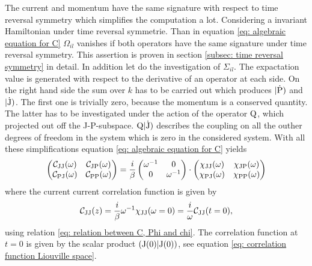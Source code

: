 The current and momentum have the same signature with respect to time reversal symmetry which simplifies the computation a lot.
Considering a invariant Hamiltonian under time reversal symmetrie.
Than in equation \eqref{eq: algebraic equation for C} $\Omega_{il}$ vanishes if both operators have the same signature under time reversal symmetry.
This assertion is proven in section \ref{subsec: time reversal symmetry} in detail.
In addition let do the investigation of $\Sigma_{il}$.
The expactation value is generated with respect to the derivative of an operator at each side. 
On the right hand side the sum over $k$ has to be carried out which produces $|\mathrm{\dot{\mathrm{P}}})$ and $|\mathrm{\dot{\mathrm{J}}})$.
The first one is trivially zero, because the momentum is a conserved quantity.
The latter has to be investigated under the action of the operator $\mathrm{Q}$, which projected out off the J-P-subspace.
$\mathrm{Q}|\mathrm{\dot{\mathrm{J}}})$ describes the coupling on all the outher degrees of freedom in the system which is zero in the considered system.
With all these simplifications equation \eqref{eq: algebraic equation for C} yields
%
\begin{align}
	\begin{pmatrix}
	\mathcal{C}_{\mathrm{JJ}}(\omega) &  \mathcal{C}_{\mathrm{JP}}(\omega) \\
	\mathcal{C}_{\mathrm{PJ}}(\omega) &  \mathcal{C}_{\mathrm{PP}}(\omega)
	\end{pmatrix}
	=
	\frac{i}{\beta}
	\begin{pmatrix}
	\omega^{-1} & 0 \\
	0 & \omega^{-1} 
	\end{pmatrix}
	\cdot
	\begin{pmatrix}
	\chi_{\mathrm{JJ}}(\omega) &  \chi_{\mathrm{JP}}(\omega) \\
	\chi_{\mathrm{PJ}}(\omega) &  \chi_{\mathrm{PP}}(\omega)
	\end{pmatrix}
\end{align}
%
where the current current correlation function is given by
%
\begin{align}
	\mathcal{C}_{\mathrm{JJ}}(z) = \frac{i}{\beta} \omega^{-1} \chi_{\mathrm{JJ}}(\omega=0) = \frac{i}{\omega} \mathcal{C}_{\mathrm{JJ}}(t=0),
	\label{eq: correlation function unpertubated system}
\end{align}
%
using relation \eqref{eq: relation between C, Phi and chi}.
The correlation function at $t = 0$ is given by the scalar product $({\mathrm{J}(0)}|{\mathrm{J}(0)})$, see equation \eqref{eq: correlation function Liouville space}.
